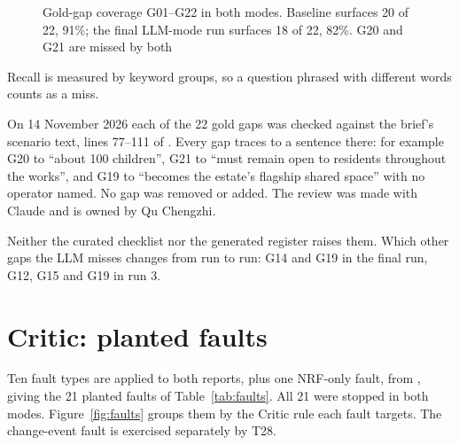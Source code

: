 \begin{figure}[htbp]
\centering

\caption{Gold-gap coverage G01--G22 in both modes. Baseline surfaces 20 of 22, 91\%; the final LLM-mode run surfaces 18 of 22, 82\%. G20 and G21 are missed by both}
\label{fig:gaps}
\end{figure}

 Recall is measured by keyword groups, so a question phrased with different words counts as a miss.

 On 14 November 2026 each of the 22 gold gaps was checked against the brief's scenario text, lines 77--111 of . Every gap traces to a sentence there: for example G20 to ``about 100 children'', G21 to ``must remain open to residents throughout the works'', and G19 to ``becomes the estate's flagship shared space'' with no operator named. No gap was removed or added. The review was made with Claude and is owned by Qu Chengzhi.

 Neither the curated checklist nor the generated register raises them. Which other gaps the LLM misses changes from run to run: G14 and G19 in the final run, G12, G15 and G19 in run 3.

\section{Critic: planted faults}
\label{sec:faults}

Ten fault types are applied to both reports, plus one NRF-only fault, from , giving the 21 planted faults of Table~\ref{tab:faults}. All 21 were stopped in both modes. Figure~\ref{fig:faults} groups them by the Critic rule each fault targets. The change-event fault  is exercised separately by T28.

